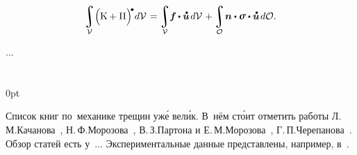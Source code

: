 \nopagebreak\vspace{-0.1em}\begin{equation}
\integral\displaylimits_{\mathcal{V}} \hspace{-0.42ex} \left(^{\mathstrut} \hspace{-0.2ex} \kineticenergydensity + \potentialenergydensity \right)^{\hspace{-0.12em}\tikz[baseline=-0.2ex] \draw[black, fill=black] (0,0) circle (.28ex);} \hspace{-0.25ex} d\mathcal{V} \hspace{.2ex}
= \hspace{-0.1ex}
\integral\displaylimits_{\mathcal{V}} \hspace{-0.5ex} \bm{f} \hspace{-0.1ex} \dotp \mathdotabove{\bm{u}} \hspace{.25ex} d\mathcal{V} \hspace{.16ex}
+ \hspace{-0.1ex}
\integral\displaylimits_{\mathcal{O}} \hspace{-0.32ex} \bm{n} \dotp \linearstress \dotp \mathdotabove{\bm{u}} \hspace{.25ex} d\mathcal{O} .
\end{equation}


...



\section*{\small \wordforbibliography}

\begin{changemargin}{\parindent}{0pt}
\fontsize{10}{12}\selectfont

\begin{otherlanguage}{russian}

Список книг по~механике трещин уж\'{е} вел\'{и}к. В~нём ст\'{о}ит отметить работы Л.\,М.\;Качанова~\cite{kachanov-fracturemechanics}, Н.\,Ф.\;Морозова~\cite{morozov-fractures}, В.\,З.\;Партона и Е.\,М.\;Морозова~\cite{parton.morozov-destructionofelastoplastic}, Г.\,П.\;Черепанова~\cite{cherepanov-fragilefracture}. Обзор статей есть у~... Экспериментальные данные представлены, например, в~\cite{kerstein.klyushnikov.lomakin.shesterikov-experimentalfracturemechanics}.

\end{otherlanguage}

\end{changemargin}
